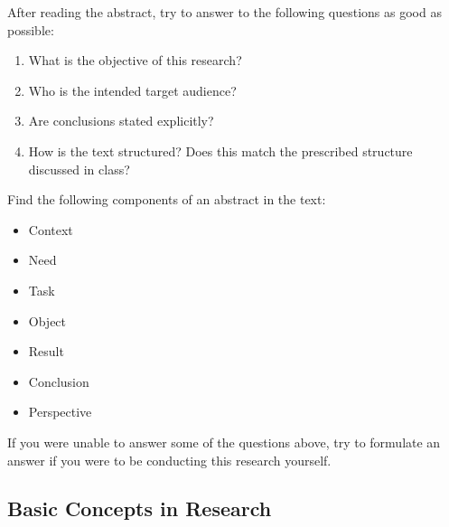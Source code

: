 \begin{exercise}
  After reading the abstract, try to answer to the following questions as good as possible:
  
  \begin{enumerate}
    \item What is the objective of this research?
    \item Who is the intended target audience?
    \item Are conclusions stated explicitly? 
    \item How is the text structured? Does this match the prescribed structure discussed in class?
  \end{enumerate}
\end{exercise}

\begin{exercise}
  Find the following components of an abstract in the text:
  
  \begin{itemize}
    \item Context
    \item Need
    \item Task
    \item Object
    \item Result
    \item Conclusion
    \item Perspective
  \end{itemize}

  If you were unable to answer some of the questions above, try to formulate an answer if you were to be conducting this research yourself.
\end{exercise}

\subsection{Basic Concepts in Research}


